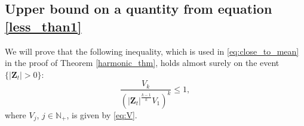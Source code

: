 \documentclass[preprint,3p,12pt]{elsarticle}
\theoremstyle{definition}
\newcommand{\V}[1]{V_{#1}}
\begin{document}
\subsection{Upper bound on a quantity from equation \eqref{less_than1}}\label{less1}
We will prove that the following inequality, which is used in \eqref{eq:close_to_mean} in the proof of Theorem \ref{harmonic_thm}, holds almost surely on the event $\{|\boldsymbol{Z}_t| > 0\}$:
        \begin{equation}
    \frac{\V{k}}
    {(|\boldsymbol{Z}_t|^{\frac{k-1}{k}}\V{1})^k} 
    \le 1,
        \end{equation}
    where $\V{j}$, $j\in\mathbb{N}_+$, is given by \eqref{eq:V}.
\end{document}

